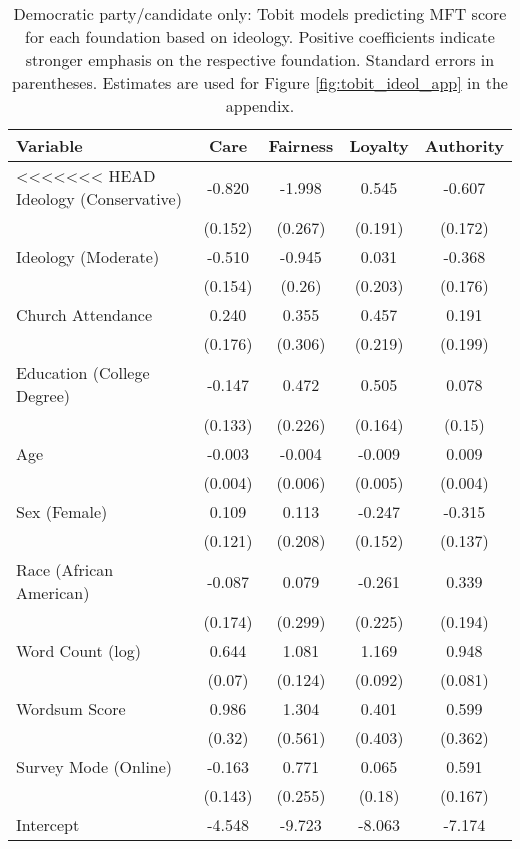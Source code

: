 \begin{table}[ht]
\centering
\caption{Democratic party/candidate only: Tobit models predicting MFT score for each foundation based 
           on ideology. Positive coefficients indicate stronger emphasis on the respective 
           foundation. Standard errors in parentheses. Estimates are used for 
           Figure \ref{fig:tobit_ideol_app} in the appendix.} 
\label{tab:tobit_dem}
\begingroup\footnotesize
\begin{tabular}{lcccc}
  \hline
Variable & Care & Fairness & Loyalty & Authority \\ 
  \hline
<<<<<<< HEAD
Ideology (Conservative) & -0.820 & -1.998 &  0.545 & -0.607 \\ 
   & (0.152) & (0.267) & (0.191) & (0.172) \\ 
  Ideology (Moderate) & -0.510 & -0.945 &  0.031 & -0.368 \\ 
   & (0.154) & (0.26) & (0.203) & (0.176) \\ 
  Church Attendance &  0.240 &  0.355 &  0.457 &  0.191 \\ 
   & (0.176) & (0.306) & (0.219) & (0.199) \\ 
  Education (College Degree) & -0.147 &  0.472 &  0.505 &  0.078 \\ 
   & (0.133) & (0.226) & (0.164) & (0.15) \\ 
  Age & -0.003 & -0.004 & -0.009 &  0.009 \\ 
   & (0.004) & (0.006) & (0.005) & (0.004) \\ 
  Sex (Female) &  0.109 &  0.113 & -0.247 & -0.315 \\ 
   & (0.121) & (0.208) & (0.152) & (0.137) \\ 
  Race (African American) & -0.087 &  0.079 & -0.261 &  0.339 \\ 
   & (0.174) & (0.299) & (0.225) & (0.194) \\ 
  Word Count (log) &  0.644 &  1.081 &  1.169 &  0.948 \\ 
   & (0.07) & (0.124) & (0.092) & (0.081) \\ 
  Wordsum Score &  0.986 &  1.304 &  0.401 &  0.599 \\ 
   & (0.32) & (0.561) & (0.403) & (0.362) \\ 
  Survey Mode (Online) & -0.163 &  0.771 &  0.065 &  0.591 \\ 
   & (0.143) & (0.255) & (0.18) & (0.167) \\ 
  Intercept & -4.548 & -9.723 & -8.063 & -7.174 \\ 

\end{tabular}
\end{table}
